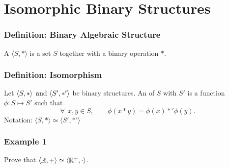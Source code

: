 \section{Isomorphic Binary Structures}

\subsubsection*{Definition: Binary Algebraic Structure}
A  $\langle S,*\rangle$ is a set $S$ together with a binary operation $*$.

\subsubsection*{Definition: Isomorphism}
Let $\langle S,*\rangle \operatorname{~\text{and}~} \langle S',*' \rangle$ be binary structures. An  of $S$ with $S'$ is a  function $\phi: S \mapsto S'$ such that
\[
    \forall~~ x,y \in S, \qquad \phi(x*y) = \phi(x) *' \phi(y).
\]
Notation: $\langle S,*\rangle \simeq \langle S',*'\rangle$

\subsubsection*{Example 1}
Prove that $\langle \mathbb{R},+\rangle \simeq \langle \mathbb{R}^+, \cdot \rangle$.

